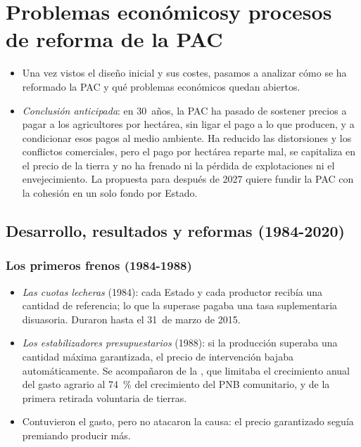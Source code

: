 \documentclass[11pt]{article}
\begin{document}
\section{Problemas económicos\cortetitulo y procesos de reforma de la PAC}\label{sec:reformas}

\begin{itemize}
\item Una vez vistos el diseño inicial y sus costes, pasamos a analizar cómo se ha reformado la PAC y qué problemas económicos quedan abiertos.
\item \emph{Conclusión anticipada}: en 30~años, la PAC ha pasado de sostener precios a pagar a los agricultores por hectárea, sin ligar el pago a lo que producen, y a condicionar esos pagos al medio ambiente. Ha reducido las distorsiones y los conflictos comerciales, pero el pago por hectárea reparte mal, se capitaliza en el precio de la tierra y no ha frenado ni la pérdida de explotaciones ni el envejecimiento. La propuesta para después de 2027 quiere fundir la PAC con la cohesión en un solo fondo por Estado.
\end{itemize}

\subsection{Desarrollo, resultados y reformas (1984-2020)}\label{sec:reformas-historia}

\subsubsection{Los primeros frenos (1984-1988)}\label{sec:primeros-frenos}

\begin{itemize}
\item \emph{Las cuotas lecheras} (1984): cada Estado y cada productor recibía una cantidad de referencia; lo que la superase pagaba una tasa suplementaria disuasoria. Duraron hasta el 31~de marzo de 2015.
\item \emph{Los estabilizadores presupuestarios} (1988): si la producción superaba una cantidad máxima garantizada, el precio de intervención bajaba automáticamente. Se acompañaron de la , que limitaba el crecimiento anual del gasto agrario al 74~\% del crecimiento del PNB comunitario, y de la primera retirada voluntaria de tierras\nocite{PE2026FichaInstrumentos}.
\item Contuvieron el gasto, pero no atacaron la causa: el precio garantizado seguía premiando producir más.
\end{itemize}
\end{document}
